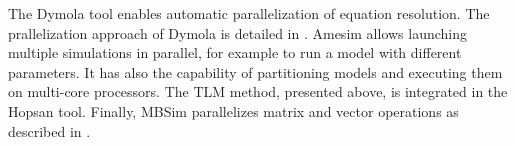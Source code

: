 The Dymola tool enables automatic parallelization of equation resolution. The prallelization approach of Dymola is detailed in \cite{elmqvist:2014}. Amesim allows launching multiple simulations in parallel, for example to run a model with different parameters. It has also the capability of partitioning models and executing them on multi-core processors. The TLM method, presented above, is integrated in the Hopsan tool. Finally, MBSim parallelizes matrix and vector operations as described in \cite{clauberg:2012}. 
